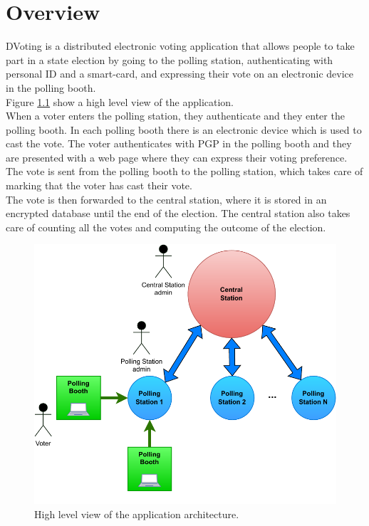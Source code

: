 %       
%
\chapter{Overview}\label{ch:overview}
DVoting is a distributed electronic voting application that allows people to take part in a state election by going to the polling station, authenticating with personal ID and a smart-card, and expressing their vote on an electronic device in the polling booth.\\

Figure \ref{fig:high_lev_arch} show a high level view of the application.\\
When a voter enters the polling station, they authenticate and they enter the polling booth. In each polling booth there is an electronic device which is used to cast the vote. The voter authenticates with PGP in the polling booth and they are presented with a web page where they can express their voting preference. The vote is sent from the polling booth to the polling station, which takes care of marking that the voter has cast their vote.\\
The vote is then forwarded to the central station, where it is stored in an encrypted database until the end of the election. The central station also takes care of counting all the votes and computing the outcome of the election.\\

\begin{figure}
    \begin{center}
        \includegraphics[scale=1]{img/high_lev_arch.pdf}
    \end{center}
    \vspace*{-0.5cm}
    \caption{High level view of the application architecture.}
    \label{fig:high_lev_arch}
\end{figure}




